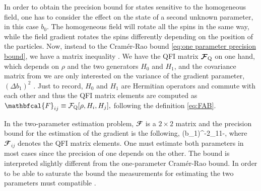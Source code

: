 In order to obtain the precision bound for states sensitive to the
homogeneous field, one has to consider the effect on the state of a second
unknown parameter, in this case $b_0$.
The homogeneous field will rotate all the spins in the same way,
while the field gradient rotates the spins
differently depending on the position of the particles.
Now, instead to the Cram\'er-Rao bound  \eqref{eq:one parameter precision bound},
we have a matrix inequality \citep{Paris2009}.
We have the QFI matrix $\boldsymbol{\mathcal{F}}_{\text{Q}}$ on one hand, which depends on $\rho$ and the two generators $H_0$ and $H_1$, and the covariance matrix from we are only interested on the variance of the gradient parameter, $(\Delta b_1)^2$ \citep{Paris2009}.
Just to record, $H_0$ and $H_1$ are Hermitian operators and commute with each other and thus the QFI matrix elements are computed as $\mathbfcal{F}_{ij}\equiv \qfif{\rho, H_i, H_j},$ following the definition \eqref{eq:FAB}.

In the two-parameter estimation problem, ${\mathbfcal{F}}$ is a $2 \times 2$ matrix and the precision bound for the estimation of the gradient is the following,
\be
\label{eq:precision bound for b1 in terms of QFI matrix elements}
(\Delta b_1)^{-2}\leq {}_{11}-,
\ee
where $\mathbfcal{F}_{ij}$ denotes the QFI matrix elements.
One must estimate both parameters in most cases since the precision of one depends on the other.
The bound is interpreted slightly different from the one-parameter Cram\'er-Rao bound.
In order to be able to saturate the bound the measurements for estimating the two parameters must compatible \citep{Paris2009}.


